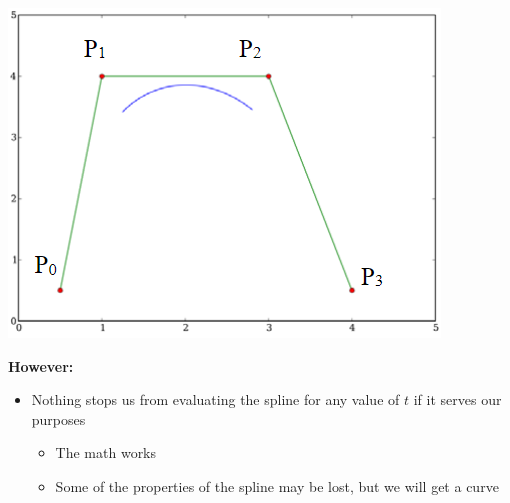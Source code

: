 \documentclass{article}
\begin{document}
\begin{center}
    \includegraphics*[scale=0.8]{W3_22.png}
\end{center}
\textbf{However:}
\begin{itemize}
    \item Nothing stops us from evaluating the spline for any value of $t$ if it serves our purposes
    \begin{itemize}
        \item The math works
        \item Some of the properties of the spline may be lost, but we will get a curve
    \end{itemize}
\end{itemize}
\end{document}

